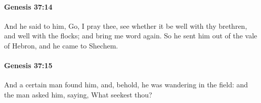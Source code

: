 		\paragraph{Genesis 37:14} %
			\label{GENESIS-37-14}

			And he said to him, Go, I pray thee, see whether it be well with thy brethren, and well with the flocks; and bring me word again. So he sent him out of the vale of Hebron, and he came to Shechem.


		\paragraph{Genesis 37:15} %
			\label{GENESIS-37-15}

			And a certain man found him, and, behold, he was wandering in the field: and the man asked him, saying, What seekest thou?


